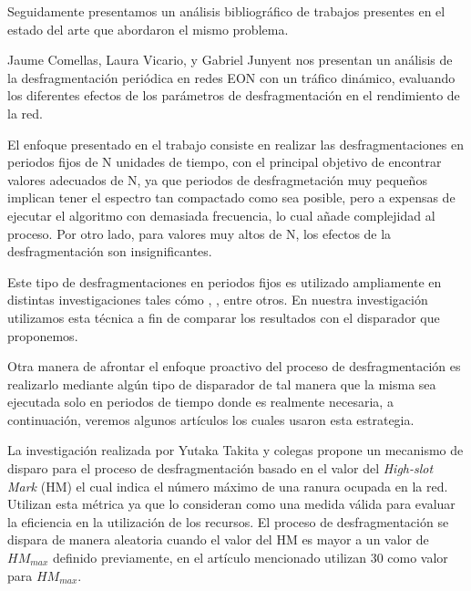 
Seguidamente presentamos un análisis bibliográfico de trabajos presentes en el estado del arte que abordaron el mismo problema.

Jaume Comellas, Laura Vicario, y Gabriel Junyent \cite{comellas2018periodic} nos presentan un análisis de la desfragmentación periódica en redes EON con un tráfico dinámico, evaluando los diferentes efectos de los parámetros de desfragmentación en el rendimiento de la red.

El enfoque presentado en el trabajo consiste en realizar las desfragmentaciones en periodos fijos de N unidades de tiempo, con el principal objetivo de encontrar valores adecuados de N, ya que periodos de desfragmetación muy pequeños implican tener el espectro tan compactado como sea posible, pero a expensas de ejecutar el algoritmo con demasiada frecuencia, lo cual añade complejidad al proceso. Por otro lado, para valores muy altos de N, los efectos de la desfragmentación son insignificantes.

Este tipo de desfragmentaciones en periodos fijos es utilizado ampliamente en distintas investigaciones tales cómo \cite{davalos2019spectrum}, \cite{luo2012partial}, entre otros. En nuestra investigación utilizamos esta técnica a fin de comparar los resultados con el disparador que proponemos.

Otra manera de afrontar el enfoque proactivo del proceso de desfragmentación es realizarlo mediante algún tipo de disparador de tal manera que la misma sea ejecutada solo en periodos de tiempo donde es realmente necesaria, a continuación, veremos algunos artículos los cuales usaron esta estrategia.

La investigación realizada por Yutaka Takita y colegas \cite{takita2016wavelength} propone un mecanismo de disparo para el proceso de desfragmentación basado en el valor del \textit{High-slot Mark} (HM) el cual indica el número máximo de una ranura ocupada en la red. Utilizan esta métrica ya que lo consideran como una medida válida para evaluar la eficiencia en la utilización de los recursos. El proceso de desfragmentación se dispara de manera aleatoria cuando el valor del HM es mayor a un valor de \( HM_{max} \) definido previamente, en el artículo mencionado utilizan 30 como valor para \( HM_{max} \). 

